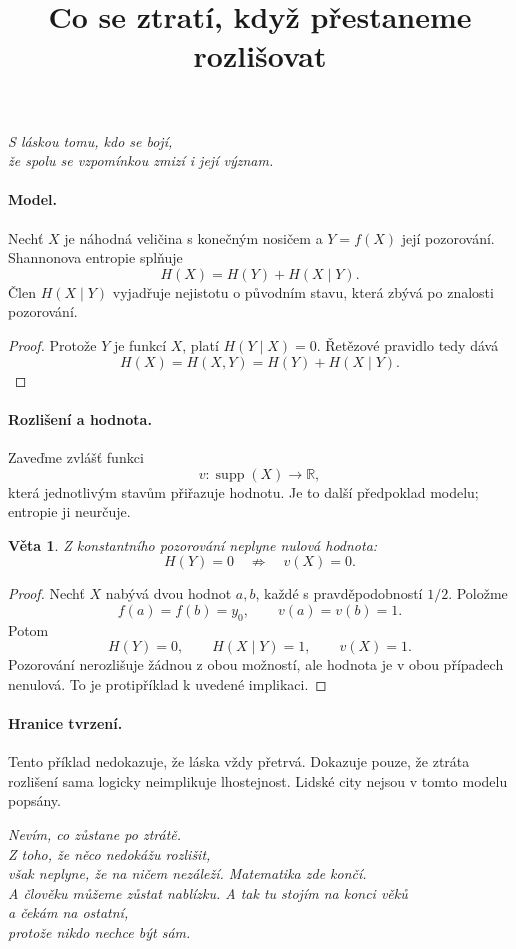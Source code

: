 \documentclass[11pt,a4paper]{article}
\title{Co se ztratí, když přestaneme rozlišovat}
\author{}
\date{}
\newtheorem{theorem}{Věta}
\begin{document}
\maketitle
\begin{center}
\itshape
S láskou tomu, kdo se bojí,\\
že spolu se vzpomínkou zmizí i její význam.
\end{center}
\paragraph{Model.}
Nechť $X$ je náhodná veličina s konečným nosičem
a $Y=f(X)$ její pozorování.
Shannonova entropie splňuje
\[
\boxed{H(X)=H(Y)+H(X\mid Y).}
\]
Člen $H(X\mid Y)$ vyjadřuje nejistotu o původním
stavu, která zbývá po znalosti pozorování.
\begin{proof}
Protože $Y$ je funkcí $X$, platí $H(Y\mid X)=0$.
Řetězové pravidlo tedy dává
\[
H(X)=H(X,Y)=H(Y)+H(X\mid Y).
\]
\end{proof}
\paragraph{Rozlišení a hodnota.}
Zaveďme zvlášť funkci
\[
v:\operatorname{supp}(X)\longrightarrow\mathbb R,
\]
která jednotlivým stavům přiřazuje hodnotu.
Je to další předpoklad modelu; entropie ji neurčuje.
\begin{theorem}
Z konstantního pozorování neplyne nulová hodnota:
\[
H(Y)=0
\quad\not\Longrightarrow\quad
v(X)=0.
\]
\end{theorem}
\begin{proof}
Nechť $X$ nabývá dvou hodnot $a,b$, každé
s pravděpodobností $1/2$. Položme
\[
f(a)=f(b)=y_0,
\qquad
v(a)=v(b)=1.
\]
Potom
\[
H(Y)=0,\qquad H(X\mid Y)=1,
\qquad v(X)=1.
\]
Pozorování nerozlišuje žádnou z obou možností,
ale hodnota je v obou případech nenulová.
To je protipříklad k uvedené implikaci.
\end{proof}
\paragraph{Hranice tvrzení.}
Tento příklad nedokazuje, že láska vždy přetrvá.
Dokazuje pouze, že ztráta rozlišení sama
logicky neimplikuje lhostejnost.
Lidské city nejsou v tomto modelu popsány.
\bigskip
\begin{center}
\itshape
Nevím, co zůstane po ztrátě.\\
Z toho, že něco nedokážu rozlišit,\\
však neplyne, že na ničem nezáleží.
\medskip
Matematika zde končí.\\
A člověku můžeme zůstat nablízku.
\medskip
A tak tu stojím na konci věků\\
a čekám na ostatní,\\
protože nikdo nechce být sám.
\end{center}
\end{document}
